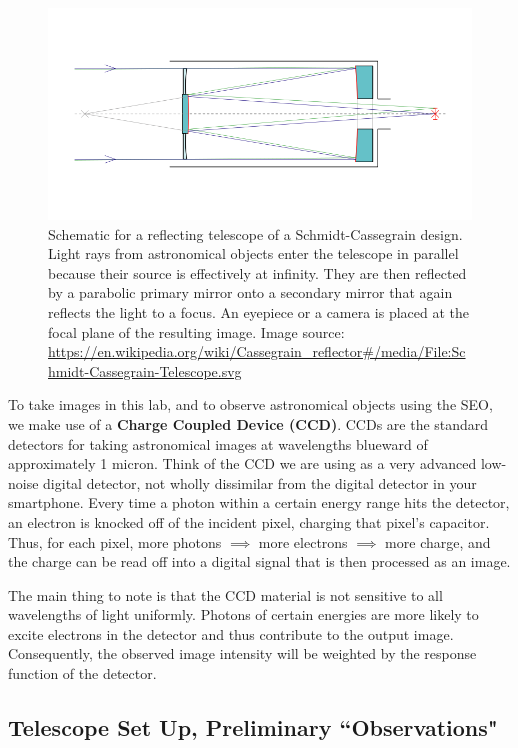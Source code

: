 \begin{figure}
	\centering
	\includegraphics[scale = 0.5]{small-optical-telescopes/Schmidt-Cassegrain-Telescope.png}
	\caption{Schematic for a reflecting telescope of a Schmidt-Cassegrain design. 
		Light rays from astronomical objects enter the telescope in parallel because their source is effectively at infinity. They are then reflected by a parabolic primary mirror onto a secondary mirror that again reflects the light to a focus. An eyepiece or a camera is placed at the focal plane of the resulting image. Image source: \url{https://en.wikipedia.org/wiki/Cassegrain\_reflector\#/media/File:Schmidt-Cassegrain-Telescope.svg}}\label{sot:fig:schmidt}
\end{figure}

To take images in this lab, and to observe astronomical objects using the SEO, we make use of a \textbf{Charge Coupled Device (CCD)}. CCDs are the standard detectors for taking astronomical images at wavelengths blueward of approximately 1 micron. Think of the CCD we are using as a
very advanced low-noise digital detector, not wholly dissimilar from the digital detector in your
smartphone. Every time a photon within a certain energy range hits the detector, an electron is knocked off of the incident pixel, charging that pixel's capacitor. Thus, for each pixel, more photons $\implies$ more electrons $\implies$ more charge, and the charge can be read off into a digital signal that is then processed as an image. 

The main thing to note is that the CCD material is not sensitive to all wavelengths of light uniformly. Photons of certain energies are more likely to excite electrons in the detector and thus contribute to the output image. Consequently, the observed image intensity will be weighted by the response function of the detector.

\subsection{Telescope Set Up, Preliminary ``Observations"}\label{ai:sec:setup}

